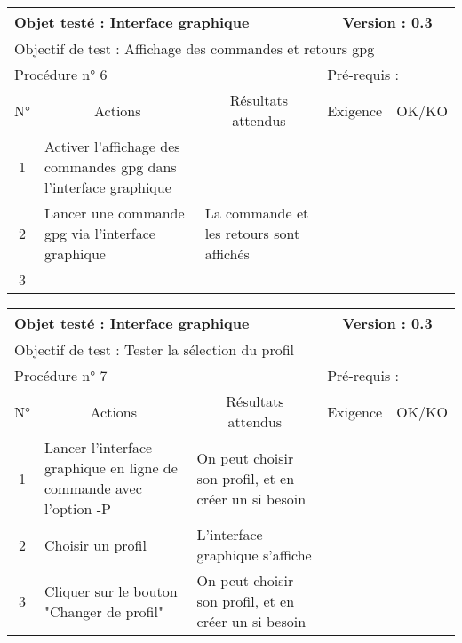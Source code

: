 \documentclass{../res/univ-projet}
\begin{document}
\begin{center}
    \begin{tabular}{|c|p{5cm}|p{5cm}|p{1.5cm}|p{1.5cm}|}
      \hline
      \multicolumn{3}{|l|}{Objet testé : Interface graphique} & \multicolumn{2}{c|}{Version : 0.3}\\ \hline
      \multicolumn{5}{|l|}{Objectif de test : Affichage des commandes et retours gpg}\\ \hline
      \multicolumn{3}{|l|}{Procédure n° 6} & \multicolumn{2}{p{3cm}|}{Pré-requis : }\\ \hline
      \multicolumn{1}{|c|}{N°} & \multicolumn{1}{c|}{Actions} & \multicolumn{1}{c|}{Résultats attendus} & 
      \multicolumn{1}{c|}{Exigence} & \multicolumn{1}{c|}{OK/KO}\\ \hline
      1 & Activer l'affichage des commandes gpg dans l'interface graphique &  &  & \\
      2 & Lancer une commande gpg via l'interface graphique & La commande et les retours sont affichés &  & \\
      3 &  &  &  & \\ \hline
    \end{tabular}
    \vskip 2.2cm



    \begin{tabular}{|c|p{5cm}|p{5cm}|p{1.5cm}|p{1.5cm}|}
      \hline
      \multicolumn{3}{|l|}{Objet testé : Interface graphique} & \multicolumn{2}{c|}{Version : 0.3}\\ \hline
      \multicolumn{5}{|l|}{Objectif de test : Tester la sélection du profil}\\ \hline
      \multicolumn{3}{|l|}{Procédure n° 7} & \multicolumn{2}{p{3cm}|}{Pré-requis : }\\ \hline
      \multicolumn{1}{|c|}{N°} & \multicolumn{1}{c|}{Actions} & \multicolumn{1}{c|}{Résultats attendus} & 
      \multicolumn{1}{c|}{Exigence} & \multicolumn{1}{c|}{OK/KO}\\ \hline
      1 & Lancer l'interface graphique en ligne de commande avec l'option -P & On peut choisir son profil, et en créer un si besoin &  & \\
      2 & Choisir un profil & L'interface graphique s'affiche &  & \\
      3 & Cliquer sur le bouton "Changer de profil" & On peut choisir son profil, et en créer un si besoin &  & \\ \hline
    \end{tabular}
    \vskip 2.2cm




\end{center}
\end{document}

